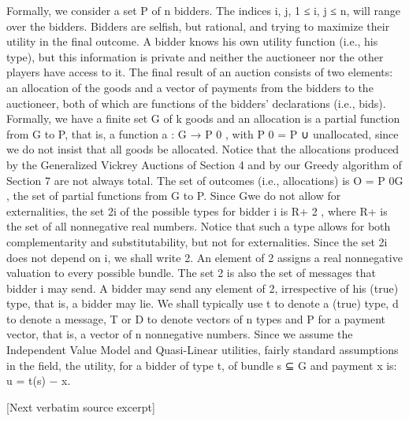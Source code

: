 \documentclass[10pt]{article}
\begin{document}
\begin{ReviewVerbatim}
Formally, we consider a set P of n bidders. The indices i, j, 1 ≤ i, j ≤ n, will
range over the bidders. Bidders are selfish, but rational, and trying to maximize their
utility in the final outcome. A bidder knows his own utility function (i.e., his type),
but this information is private and neither the auctioneer nor the other players have
access to it. The final result of an auction consists of two elements: an allocation
of the goods and a vector of payments from the bidders to the auctioneer, both of
which are functions of the bidders’ declarations (i.e., bids). Formally, we have a
finite set G of k goods and an allocation is a partial function from G to P, that is, a
function a : G → P 0 , with P 0 = P ∪ {unallocated}, since we do not insist that all
goods be allocated. Notice that the allocations produced by the Generalized Vickrey
Auctions of Section 4 and by our Greedy algorithm of Section 7 are not always
total. The set of outcomes (i.e., allocations) is O = P 0G , the set of partial functions
from G to P. Since Gwe do not allow for externalities, the set 2i of the possible types
for bidder i is R+ 2 , where R+ is the set of all nonnegative real numbers. Notice
that such a type allows for both complementarity and substitutability, but not for
externalities. Since the set 2i does not depend on i, we shall write 2. An element
of 2 assigns a real nonnegative valuation to every possible bundle. The set 2 is
also the set of messages that bidder i may send. A bidder may send any element of
2, irrespective of his (true) type, that is, a bidder may lie. We shall typically use t
to denote a (true) type, d to denote a message, T or D to denote vectors of n types
and P for a payment vector, that is, a vector of n nonnegative numbers.
Since we assume the Independent Value Model and Quasi-Linear utilities, fairly
standard assumptions in the field, the utility, for a bidder of type t, of bundle s ⊆ G
and payment x is:
u = t(s) − x.

[Next verbatim source excerpt]


\end{ReviewVerbatim}
\end{document}
